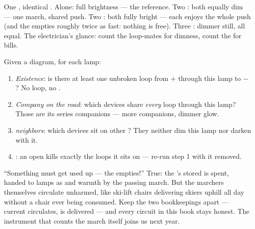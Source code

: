 \begin{example}\label{ex:g7:circuits-series-parallel:brightness}
One , identical . Alone: full brightness --- the
reference. Two : both equally dim --- one march, shared
push. Two : both fully bright --- each  enjoys
the whole push (and the  empties roughly twice as fast:
nothing is free). Three : dimmer still, all equal. The
electrician's glance: count the loop-mates for dimness, count the
 for  bills.
\end{example}

\begin{method}\label{met:g7:circuits-series-parallel:predict}
Given a diagram, for each lamp:
\begin{enumerate}
  \item \emph{Existence}: is there at least one unbroken loop
        from $+$ through this lamp to $-$? No loop, no .
  \item \emph{Company on the road}: which devices share
        \emph{every} loop through this lamp? Those are its series
        companions --- more companions, dimmer glow.
  \item \emph{ neighbors}: which devices sit on other
        ? They neither dim this lamp nor darken with it.
  \item \emph{}: an open  kills exactly the loops
        it sits on --- re-run step 1 with it removed.
\end{enumerate}
\end{method}

\begin{remark}\label{rem:g7:circuits-series-parallel:whyhard}
``Something must get used up --- the  empties!'' True: the
's stored \emph{} is spent, handed to lamps as 
and warmth by the passing march. But the marchers themselves
circulate unharmed, like ski-lift chairs delivering skiers
uphill all day without a chair ever being consumed. Keep the two
bookkeepings apart --- current circulates,  is delivered
--- and every circuit in this book stays honest. The instrument
that counts the march itself joins us next year.
\end{remark}

